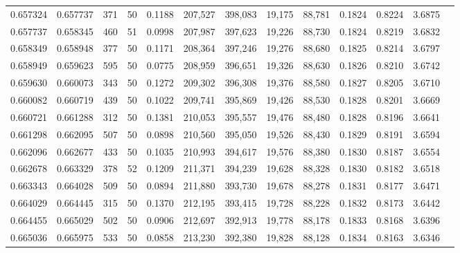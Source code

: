 \begin{tabular}{rrrrrrrrrrrrr}
0.657324 & 0.657737 &   371 &  50 &                                     0.1188 & 207,527 & 398,083 &  19,175 &  88,781 & 0.1824 & 0.8224 & 3.6875 \\
0.657737 & 0.658345 &   460 &  51 &                                     0.0998 & 207,987 & 397,623 &  19,226 &  88,730 & 0.1824 & 0.8219 & 3.6832 \\
0.658349 & 0.658948 &   377 &  50 &                                     0.1171 & 208,364 & 397,246 &  19,276 &  88,680 & 0.1825 & 0.8214 & 3.6797 \\
0.658949 & 0.659623 &   595 &  50 &                                     0.0775 & 208,959 & 396,651 &  19,326 &  88,630 & 0.1826 & 0.8210 & 3.6742 \\
0.659630 & 0.660073 &   343 &  50 &                                     0.1272 & 209,302 & 396,308 &  19,376 &  88,580 & 0.1827 & 0.8205 & 3.6710 \\
0.660082 & 0.660719 &   439 &  50 &                                     0.1022 & 209,741 & 395,869 &  19,426 &  88,530 & 0.1828 & 0.8201 & 3.6669 \\
0.660721 & 0.661288 &   312 &  50 &                                     0.1381 & 210,053 & 395,557 &  19,476 &  88,480 & 0.1828 & 0.8196 & 3.6641 \\
0.661298 & 0.662095 &   507 &  50 &                                     0.0898 & 210,560 & 395,050 &  19,526 &  88,430 & 0.1829 & 0.8191 & 3.6594 \\
0.662096 & 0.662677 &   433 &  50 &                                     0.1035 & 210,993 & 394,617 &  19,576 &  88,380 & 0.1830 & 0.8187 & 3.6554 \\
0.662678 & 0.663329 &   378 &  52 &                                     0.1209 & 211,371 & 394,239 &  19,628 &  88,328 & 0.1830 & 0.8182 & 3.6518 \\
0.663343 & 0.664028 &   509 &  50 &                                     0.0894 & 211,880 & 393,730 &  19,678 &  88,278 & 0.1831 & 0.8177 & 3.6471 \\
0.664029 & 0.664445 &   315 &  50 &                                     0.1370 & 212,195 & 393,415 &  19,728 &  88,228 & 0.1832 & 0.8173 & 3.6442 \\
0.664455 & 0.665029 &   502 &  50 &                                     0.0906 & 212,697 & 392,913 &  19,778 &  88,178 & 0.1833 & 0.8168 & 3.6396 \\
0.665036 & 0.665975 &   533 &  50 &                                     0.0858 & 213,230 & 392,380 &  19,828 &  88,128 & 0.1834 & 0.8163 & 3.6346 \\

\end{tabular}
